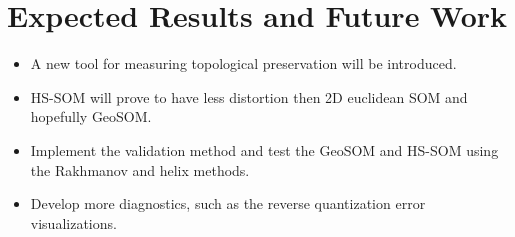 \documentclass[11pt]{article}
\begin{document}
\section{Expected Results and Future Work}
\begin{itemize}
\item A new tool for measuring topological preservation will be introduced.
\item HS-SOM will prove to have less distortion then 2D euclidean SOM and hopefully GeoSOM.
\item Implement the validation method and test the GeoSOM and HS-SOM using the Rakhmanov and helix methods.
\item Develop more diagnostics, such as the reverse quantization error visualizations.
\end{itemize}





\end{document}
